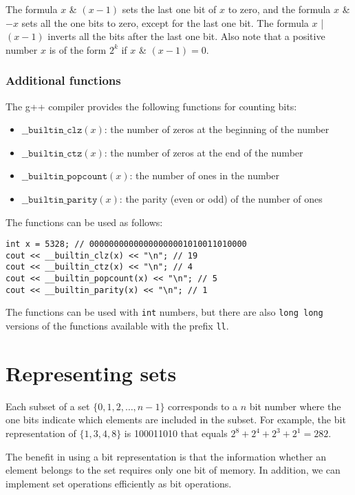 The formula $x$ \& $(x-1)$ sets the last
one bit of $x$ to zero,
and the formula $x$ \& $-x$ sets all the
one bits to zero, except for the last one bit.
The formula $x$ | $(x-1)$
inverts all the bits after the last one bit.
Also note that a positive number $x$ is
of the form $2^k$ if $x$ \& $(x-1) = 0$.

\subsubsection*{Additional functions}

The g++ compiler provides the following
functions for counting bits:

\begin{itemize}
\item
$\texttt{\_\_builtin\_clz}(x)$:
the number of zeros at the beginning of the number
\item
$\texttt{\_\_builtin\_ctz}(x)$:
the number of zeros at the end of the number
\item
$\texttt{\_\_builtin\_popcount}(x)$:
the number of ones in the number
\item
$\texttt{\_\_builtin\_parity}(x)$:
the parity (even or odd) of the number of ones
\end{itemize}
\begin{samepage}

The functions can be used as follows:
\begin{lstlisting}
int x = 5328; // 00000000000000000001010011010000
cout << __builtin_clz(x) << "\n"; // 19
cout << __builtin_ctz(x) << "\n"; // 4
cout << __builtin_popcount(x) << "\n"; // 5
cout << __builtin_parity(x) << "\n"; // 1
\end{lstlisting}
\end{samepage}

The functions can be used with \texttt{int} numbers,
but there are also \texttt{long long} versions
of the functions
available with the prefix \texttt{ll}.

\section{Representing sets}

Each subset of a set $\{0,1,2,\ldots,n-1\}$
corresponds to a $n$ bit number
where the one bits indicate which elements
are included in the subset.
For example, the bit representation of $\{1,3,4,8\}$
is 100011010 that equals $2^8+2^4+2^3+2^1=282$.

The benefit in using a bit representation is
that the information whether an element belongs
to the set requires only one bit of memory.
In addition, we can implement set operations
efficiently as bit operations.

